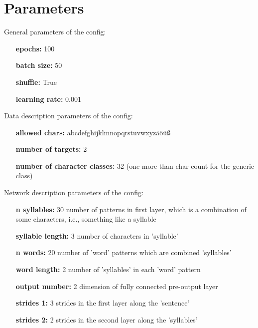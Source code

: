 \documentclass[a4paper,10pt,twoside]{article}
\begin{document}
 
\section{Parameters}

        General parameters of the config:
        

        \begin{itemize}
        \item[{\bf epochs:}] 100
        \item[{\bf batch size:}] 50
        \item[{\bf shuffle:}] True
        \item[{\bf learning rate:}] 0.001
        \end{itemize}
        

        
        Data description parameters of the config:
        

        \begin{itemize}
        \item[{\bf allowed chars:}] abcdefghijklmnopqrstuvwxyzäöüß 
        \item[{\bf number of targets:}] 2
        \item[{\bf number of character classes:}] 32 (one more than char count for the generic class)
        \end{itemize}
        

        
        Network description parameters of the config:
        

        \begin{itemize}
        \item[{\bf n syllables:}] 30 number of patterns in first layer, which is a combination of some characters, i.e., something like a syllable
        \item[{\bf syllable length:}] 3 number of characters in 'syllable'
        \item[{\bf n words:}] 20 number of 'word' patterns which are combined 'syllables'
        \item[{\bf word length:}] 2 number of 'syllables' in each 'word' pattern
        \item[{\bf output number:}] 2 dimension of fully connected pre-output layer
        \item[{\bf strides 1:}] 3 strides in the first layer along the 'sentence'
        \item[{\bf strides 2:}] 2 strides in the second layer along the 'syllables'
        \end{itemize}
        
\end{document}
